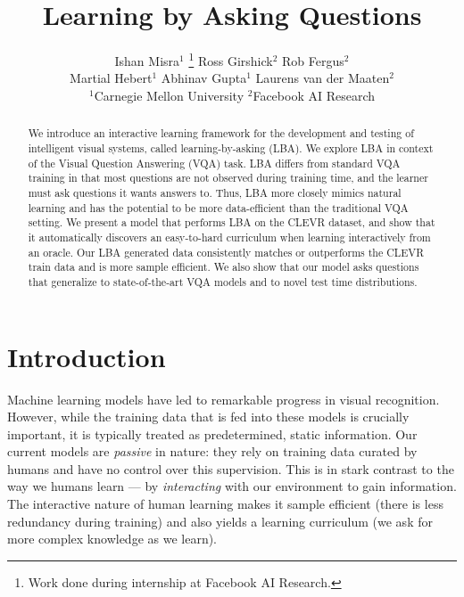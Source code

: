 \documentclass[10pt,twocolumn,letterpaper]{article}
\begin{document}
\title{Learning by Asking Questions}

\author{
    Ishan Misra$^{1}$ \thanks{Work done during internship at Facebook AI Research.}  \quad \quad Ross Girshick$^2$ \quad \quad Rob Fergus$^2$ \\ \quad \quad Martial Hebert$^1$ \quad \quad Abhinav Gupta$^1$ \quad \quad Laurens van der Maaten$^2$ \\
    \vspace{0.1in}
    $^1$Carnegie Mellon University \quad $^2$Facebook AI Research
}

\maketitle

\begin{abstract}

We introduce an interactive learning framework for the development and testing of intelligent visual systems, called learning-by-asking (LBA).  We explore LBA in context of the Visual Question Answering (VQA) task. LBA differs from standard VQA training in that most questions are not observed during training time, and the learner must ask questions it wants answers to. Thus, LBA more closely mimics natural learning and has the potential to be more data-efficient than the traditional VQA setting. We present a model that performs LBA on the CLEVR dataset, and show that it automatically discovers an easy-to-hard curriculum when learning interactively from an oracle. Our LBA generated data consistently matches or outperforms the CLEVR train data and is more sample efficient. We also show that our model asks questions that generalize to state-of-the-art VQA models and to novel test time distributions.
\end{abstract}

\section{Introduction}
Machine learning models have led to remarkable progress in visual recognition. However, while the training data that is fed into these models is crucially important, it is typically treated as predetermined, static information. Our current models are \emph{passive} in nature: they rely on training data curated by humans and have no control over this supervision. This is in stark contrast to the way we humans learn --- by \emph{interacting} with our environment to gain information.
The interactive nature of human learning makes it sample efficient (there is less redundancy during training) and also yields a learning curriculum (we ask for more complex knowledge as we learn).
\end{document}
